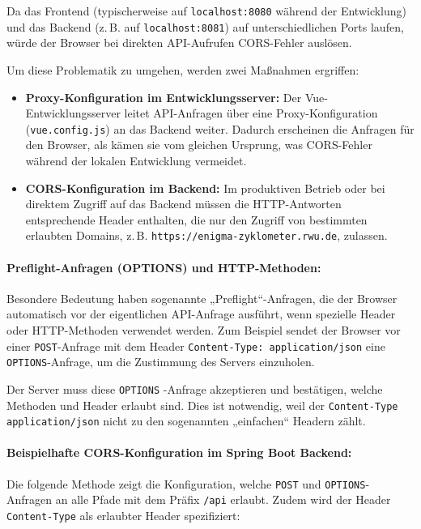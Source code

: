 \documentclass[12pt, ngerman, a4paper, numbers=noenddot]{article}
\begin{document}
Da das Frontend (typischerweise auf \lstinline|localhost:8080| während der Entwicklung) und das Backend (z.\,B. auf \lstinline|localhost:8081|) auf unterschiedlichen Ports laufen, würde der Browser bei direkten API-Aufrufen CORS-Fehler auslösen.

Um diese Problematik zu umgehen, werden zwei Maßnahmen ergriffen:

\begin{itemize}
	\item \textbf{Proxy-Konfiguration im Entwicklungsserver:}  
	Der Vue\hyp{}Entwicklungsserver leitet API-Anfragen über eine Proxy-Konfiguration (\lstinline|vue.config.js|) an das Backend weiter. Dadurch erscheinen die Anfragen für den Browser, als kämen sie vom gleichen Ursprung, was CORS-Fehler während der lokalen Entwicklung vermeidet.
	
	\item \textbf{CORS-Konfiguration im Backend:}  
	Im produktiven Betrieb oder bei direktem Zugriff auf das Backend müssen die HTTP-Antworten entsprechende Header enthalten, die nur den Zugriff von bestimmten erlaubten Domains, z.\,B. \lstinline|https://enigma-zyklometer.rwu.de|, zulassen.
\end{itemize}


\newpage
\paragraph{Preflight-Anfragen (OPTIONS) und HTTP-Methoden:}

Besondere Bedeutung haben sogenannte „Preflight“-Anfragen, die der Browser automatisch vor der eigentlichen API-Anfrage ausführt, wenn spezielle Header oder HTTP-Methoden verwendet werden. Zum Beispiel sendet der Browser vor einer \lstinline|POST|-Anfrage mit dem Header \lstinline|Content-Type: application/json| eine \lstinline|OPTIONS|-Anfrage, um die Zustimmung des Servers einzuholen. 

Der Server muss diese \lstinline|OPTIONS| -Anfrage akzeptieren und bestätigen, welche Methoden und Header erlaubt sind. Dies ist notwendig, weil der \lstinline|Content-Type| \lstinline|application/json| nicht zu den sogenannten „einfachen“ Headern zählt.

\paragraph{Beispielhafte CORS-Konfiguration im Spring Boot Backend:}

Die folgende Methode zeigt die Konfiguration, welche \lstinline|POST| und \lstinline|OPTIONS|-Anfragen an alle Pfade mit dem Präfix \lstinline|/api| erlaubt. Zudem wird der Header \lstinline|Content-Type| als erlaubter Header spezifiziert:
\end{document}
